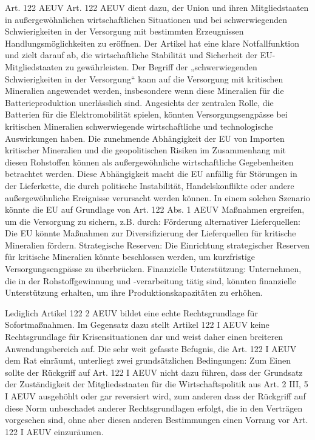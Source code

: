 \documentclass[12pt,a4paper,oneside]{book} %
\begin{document}
	Art. 122 AEUV
	Art. 122 AEUV dient dazu, der Union und ihren Mitgliedstaaten in außergewöhnlichen wirtschaftlichen Situationen und bei schwerwiegenden Schwierigkeiten in der Versorgung mit bestimmten Erzeugnissen Handlungsmöglichkeiten zu eröffnen. Der Artikel hat eine klare Notfallfunktion und zielt darauf ab, die wirtschaftliche Stabilität und Sicherheit der EU-Mitgliedstaaten zu gewährleisten. Der Begriff der „schwerwiegenden Schwierigkeiten in der Versorgung“ kann auf die Versorgung mit kritischen Mineralien angewendet werden, insbesondere wenn diese Mineralien für die Batterieproduktion unerlässlich sind. Angesichts der zentralen Rolle, die Batterien für die Elektromobilität spielen, könnten Versorgungsengpässe bei kritischen Mineralien schwerwiegende wirtschaftliche und technologische Auswirkungen haben. Die zunehmende Abhängigkeit der EU von Importen kritischer Mineralien und die geopolitischen Risiken im Zusammenhang mit diesen Rohstoffen können als außergewöhnliche wirtschaftliche Gegebenheiten betrachtet werden. Diese Abhängigkeit macht die EU anfällig für Störungen in der Lieferkette, die durch politische Instabilität, Handelskonflikte oder andere außergewöhnliche Ereignisse verursacht werden können.  In einem solchen Szenario könnte die EU auf Grundlage von Art. 122 Abs. 1 AEUV Maßnahmen ergreifen, um die Versorgung zu sichern, z.B. durch: Förderung alternativer Lieferquellen: Die EU könnte Maßnahmen zur Diversifizierung der Lieferquellen für kritische Mineralien fördern.
	Strategische Reserven: Die Einrichtung strategischer Reserven für kritische Mineralien könnte beschlossen werden, um kurzfristige Versorgungsengpässe zu überbrücken. Finanzielle Unterstützung: Unternehmen, die in der Rohstoffgewinnung und -verarbeitung tätig sind, könnten finanzielle Unterstützung erhalten, um ihre Produktionskapazitäten zu erhöhen.
	
	Lediglich Artikel 122 2 AEUV bildet eine echte Rechtsgrundlage für Sofortmaßnahmen. Im Gegensatz dazu stellt Artikel 122 I AEUV keine Rechtsgrundlage für Krisensituationen dar und weist daher einen breiteren Anwendungsbereich auf. Die sehr weit gefasste Befugnis, die Art. 122 I AEUV dem Rat einräumt, unterliegt zwei grundsätzlichen Bedingungen: Zum Einen sollte der Rückgriff auf Art. 122 I AEUV nicht dazu führen, dass der Grundsatz der Zuständigkeit der Mitgliedsstaaten für die Wirtschaftspolitik aus Art. 2 III, 5 I AEUV ausgehöhlt oder gar reversiert wird, zum anderen dass der Rückgriff auf diese Norm unbeschadet anderer Rechtsgrundlagen erfolgt, die in den Verträgen vorgesehen sind, ohne aber diesen anderen Bestimmungen einen Vorrang vor Art. 122 I AEUV einzuräumen.\autocite{chamon_anwendung_2023}
	
\end{document}
